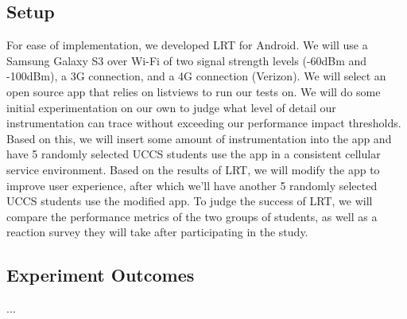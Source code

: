 \subsection{Setup}
For ease of implementation, we developed LRT for Android. We will use a Samsung Galaxy S3
over Wi-Fi of two signal strength levels (-60dBm and -100dBm), a 3G connection, and a 4G connection
(Verizon). We will select an open source app that relies on listviews to run our tests on. We will
do some initial experimentation on our own to judge what level of detail our instrumentation can
trace without exceeding our performance impact thresholds. Based on this, we will insert some
amount of instrumentation into the app and have 5 randomly selected UCCS students use the app
in a consistent cellular service environment. Based on the results of LRT, we will modify the
app to improve user experience, after which we'll have another 5 randomly selected UCCS students
use the modified app. To judge the success of LRT, we will compare the performance metrics of the
two groups of students, as well as a reaction survey they will take after participating in the
study.

\subsection{Experiment Outcomes}
...


